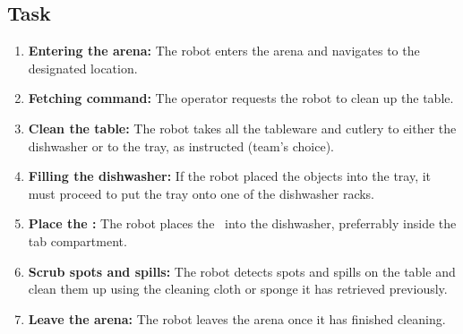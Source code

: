 \subsection{Task}
	\begin{enumerate}
		\item \textbf{Entering the arena:} The robot enters the arena and navigates to the designated location.
		\item \textbf{Fetching command:} The operator requests the robot to clean up the table.
		\item \textbf{Clean the table:} The robot takes all the tableware and cutlery to either the dishwasher or to the tray, as instructed (team's choice).
		\item \textbf{Filling the dishwasher:} If the robot placed the objects into the tray, it must proceed to put the tray onto one of the dishwasher racks.
		\item \textbf{Place the \TidePod:} The robot places the  \TidePod~into the dishwasher, preferrably inside the tab compartment.
		\item \textbf{Scrub spots and spills:} The robot detects spots and spills on the table and clean them up using the cleaning cloth or sponge it has retrieved previously.
		\item \textbf{Leave the arena:} The robot leaves the arena once it has finished cleaning.
	\end{enumerate}

